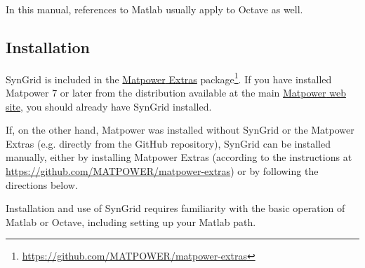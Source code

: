 \documentclass[12pt]{article}
\newcommand{\matlab}[0]{{\sc Matlab}}
\newcommand{\matpower}[0]{{\sc Matpower}}
\newcommand{\matpowerurl}[0]{http://www.pserc.cornell.edu/matpower/}
\newcommand{\matpowerextras}[0]{{\matpower{} Extras}}
\newcommand{\matpowerextrasurl}[0]{https://github.com/MATPOWER/matpower-extras}
\newcommand{\matpowerextraslink}[0]{\href{\matpowerextrasurl}{\matpowerextras{}}}
\newcommand{\syngrid}[0]{{SynGrid}}
\numberwithin{equation}{section}
\numberwithin{table}{section}
\numberwithin{figure}{section}
\begin{document}
In this manual, references to \matlab{} usually apply to Octave as well.

\subsection{Installation}
\label{sec:installation}

\syngrid{} is included in the \matpowerextraslink{} package\footnote{\url{\matpowerextrasurl}}. If you have installed \matpower{} 7 or later from the distribution available at the main \href{\matpowerurl}{\matpower{} web site}, you should already have \syngrid{} installed.

If, on the other hand, \matpower{} was installed without \syngrid{} or the  \matpowerextras{} (e.g. directly from the GitHub repository), \syngrid{} can be installed manually, either by installing \matpowerextras{} (according to the instructions at \url{\matpowerextrasurl}) or by following the directions below.

Installation and use of \syngrid{} requires familiarity with the basic operation of \matlab{} or Octave, including setting up your \matlab{} path.
\end{document}
